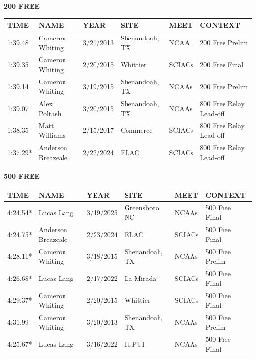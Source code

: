 \begin{table}[H]
\centering
\begin{minipage}[t]{0.48\textwidth}
\centering
\textbf{200 FREE}\\[0.1cm]
\begin{tabular}{@{}p{1.8cm}p{2.8cm}p{1.2cm}p{1.4cm}p{1.4cm}p{2.0cm}@{}}
\hline
    \textbf{TIME} & \textbf{NAME} & \textbf{YEAR} & \textbf{SITE} & \textbf{MEET} & \textbf{CONTEXT} \\
\hline
    1:39.48 & Cameron Whiting & 3/21/2013 & Shenandoah, TX & NCAA & 200 Free Prelim \\
    1:39.35 & Cameron Whiting & 2/20/2015 & Whittier & SCIACs & 200 Free Final \\
    1:39.14 & Cameron Whiting & 3/19/2015 & Shenandoah, TX & NCAAs & 200 Free Prelim \\
    1:39.07 & Alex Poltash & 3/20/2015 & Shenandoah, TX & NCAAs & 800 Free Relay Lead-off \\
    1:38.35 & Matt Williams & 2/15/2017 & Commerce & SCIACs & 800 Free Relay Lead-off \\
    1:37.29* & Anderson Breazeale & 2/22/2024 & ELAC & SCIACs & 800 Free Relay Lead-off \\
\hline
\end{tabular}
\end{minipage}\hfill
\begin{minipage}[t]{0.48\textwidth}
\centering
\textbf{500 FREE}\\[0.1cm]
\begin{tabular}{@{}p{1.8cm}p{2.8cm}p{1.2cm}p{1.4cm}p{1.4cm}p{2.0cm}@{}}
\hline
    \textbf{TIME} & \textbf{NAME} & \textbf{YEAR} & \textbf{SITE} & \textbf{MEET} & \textbf{CONTEXT} \\
\hline
    4:24.54* & Lucas Lang & 3/19/2025 & Greensboro NC & NCAAs & 500 Free Final \\
    4:24.75* & Anderson Breazeale & 2/23/2024 & ELAC & SCIACs & 500 Free Final \\
    4:28.11* & Cameron Whiting & 3/18/2015 & Shenandoah, TX & NCAAs & 500 Free Prelim \\
    4:26.68* & Lucas Lang & 2/17/2022 & La Mirada & SCIACs & 500 Free Final \\
    4:29.37* & Cameron Whiting & 2/20/2015 & Whittier & SCIACs & 500 Free Final \\
    4:31.99 & Cameron Whiting & 3/20/2013 & Shenandoah, TX & NCAAs & 500 Free Prelim \\
    4:25.67* & Lucas Lang & 3/16/2022 & IUPUI & NCAAs & 500 Free Final \\
\hline
\end{tabular}
\end{minipage}
\end{table}

